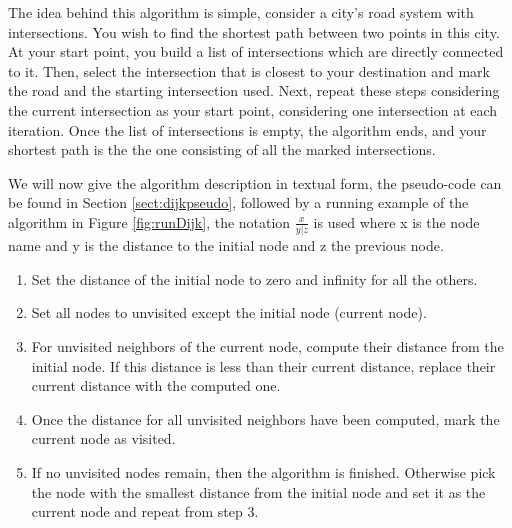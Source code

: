  The idea behind this algorithm is simple, consider a city's road system with intersections. You wish to find the shortest path between two points in this city. At your start point, you build a list of intersections which are directly connected to it. Then, select the intersection that is closest to your destination and mark the road and the starting intersection used. Next, repeat these steps considering the current intersection as your start point, considering one intersection at each iteration. Once the list of intersections is empty, the algorithm ends, and your shortest path is the the one consisting of all the marked intersections.

We will now give the algorithm description in textual form, the pseudo-code can be found in Section \ref{sect:dijkpseudo}, followed by a running example of the algorithm in Figure \ref{fig:runDijk}, the notation $\frac{x}{y|z}$ is used where x is the node name and y is the distance to the initial node and z the previous node. 

\begin{enumerate}
 \item Set the distance of the initial node to zero and infinity for all the others.
 \item Set all nodes to unvisited except the initial node (current node).
 \item For unvisited neighbors of the current node, compute their distance from the initial node. If this distance is less than their current distance, replace their current distance with the computed one.
 \item Once the distance for all unvisited neighbors have been computed, mark the current node as visited. 
 \item If no unvisited nodes remain, then the algorithm is finished. Otherwise pick the node with the smallest distance from the initial node and set it as the current node and repeat from step 3.
\end{enumerate}

